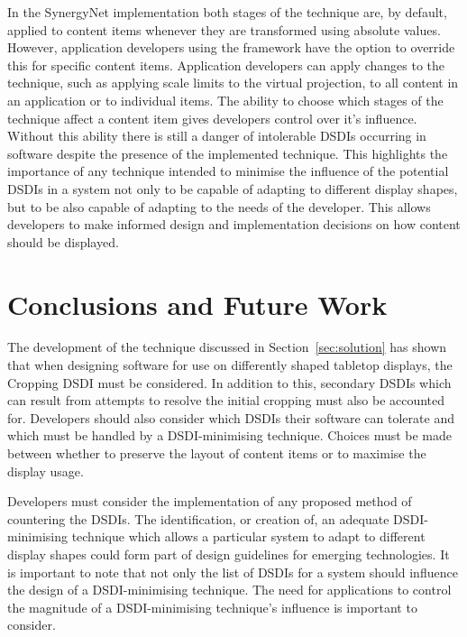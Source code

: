 \documentclass[review,5p,times,twocolumn]{elsarticle}
\begin{document}
In the SynergyNet implementation both stages of the technique are, by default, applied to content items whenever they are transformed using absolute values.
However, application developers using the framework have the option to override this for specific content items.
Application developers can apply changes to the technique, such as applying scale limits to the virtual projection, to all content in an application or to individual items.
The ability to choose which stages of the technique affect a content item gives developers control over it's influence.
Without this ability there is still a danger of intolerable \acp{DSDI} occurring in software despite the presence of the implemented technique.
This highlights the importance of any technique intended to minimise the influence of the potential \acp{DSDI} in a system not only to be capable of adapting to different display shapes, but to be also capable of adapting to the needs of the developer. 
This allows developers to make informed design and implementation decisions on how content should be displayed.

\section{Conclusions and Future Work}
\label{sec:conclusion}

The development of the technique discussed in Section~\ref{sec:solution} has shown that when designing software for use on differently shaped tabletop displays, the Cropping \ac{DSDI} must be considered.
In addition to this, secondary \acp{DSDI} which can result from attempts to resolve the initial cropping must also be accounted for.
Developers should also consider which \acp{DSDI} their software can tolerate and which must be handled by a \ac{DSDI}-minimising technique.
Choices must be made between whether to preserve the layout of content items or to maximise the display usage.

Developers must consider the implementation of any proposed method of countering the \acp{DSDI}.
The identification, or creation of, an adequate \ac{DSDI}-minimising technique which allows a particular system to adapt to different display shapes could form part of design guidelines for emerging technologies.
It is important to note that not only the list of \acp{DSDI} for a system should influence the design of a \ac{DSDI}-minimising technique.
The need for applications to control the magnitude of a \ac{DSDI}-minimising technique's influence is important to consider.
\end{document}
